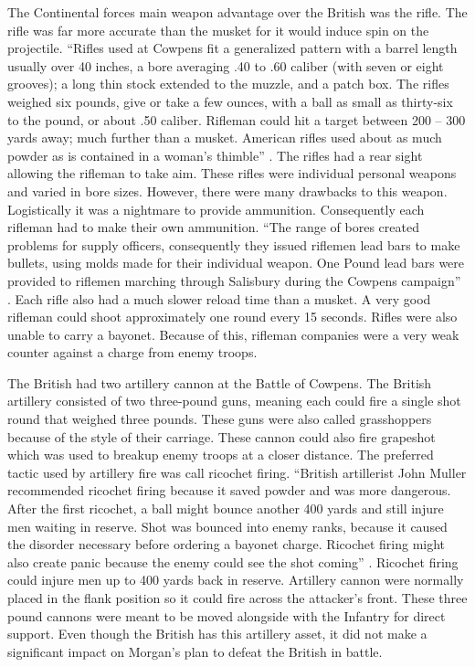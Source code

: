 The Continental forces main weapon advantage over the British was the rifle.
The rifle was far more accurate than the musket for it would induce spin on the
projectile.  “Rifles used at Cowpens fit a generalized pattern with a barrel
length usually over 40 inches, a bore averaging .40 to .60 caliber (with seven
or eight grooves); a long thin stock extended to the muzzle, and a patch box.
The rifles weighed six pounds, give or take a few ounces, with a ball as small
as thirty-six to the pound, or about .50 caliber.  Rifleman could hit a target
between 200 – 300 yards away; much further than a musket.  American rifles used
about as much powder as is contained in a woman’s thimble”
\cite[pp.13-14]{babits_devil_2001}.
The rifles had a rear sight allowing the rifleman to take aim.  These rifles
were individual personal weapons and varied in bore sizes.  However, there were
many drawbacks to this weapon.  Logistically it was a nightmare to provide
ammunition.  Consequently each rifleman had to make their own ammunition.  “The
range of bores created problems for supply officers, consequently they issued
riflemen lead bars to make bullets, using molds made for their individual
weapon.  One Pound lead bars were provided to riflemen marching through
Salisbury during the Cowpens campaign” \cite[p.14]{babits_devil_2001}.  Each rifle also had a
much slower reload time than a musket.  A very good rifleman could shoot
approximately one round every 15 seconds.  Rifles were also unable to carry a
bayonet.  Because of this, rifleman companies were a very weak counter against a
charge from enemy troops.

The British had two artillery cannon at the Battle of Cowpens.  The British
artillery consisted of two three-pound guns, meaning each could fire a single
shot round that weighed three pounds.   These guns were also called grasshoppers
because of the style of their carriage.  These cannon could also fire grapeshot
which was used to breakup enemy troops at a closer distance.  The preferred
tactic used by artillery fire was call ricochet firing. “British artillerist
John Muller recommended ricochet firing because it saved powder and was more
dangerous.  After the first ricochet, a ball might bounce another 400 yards and
still injure men waiting in reserve.  Shot was bounced into enemy ranks, because
it caused the disorder necessary before ordering a bayonet charge.  Ricochet
firing might also create panic because the enemy could see the shot coming”
\cite[p.21]{babits_devil_2001}.  Ricochet firing could injure men up to 400 yards back in
reserve.  Artillery cannon were normally placed in the flank position so it
could fire across the attacker’s front.  These three pound cannons were meant to
be moved alongside with the Infantry for direct support.  Even though the
British has this artillery asset, it did not make a significant impact on
Morgan’s plan to defeat the British in battle.   

